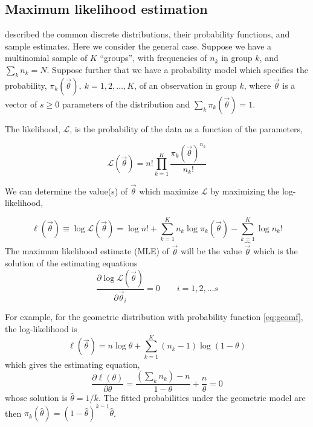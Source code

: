 \subsection{Maximum likelihood estimation}
 described the common discrete distributions,
their probability functions, and sample estimates.
Here we consider the general case.
Suppose we have a multinomial sample of
$K$ ``groups'', with frequencies of $n_k$ in group
$k$, and $\sum_k n_k = N$.
Suppose further that we have a probability model which specifies
the probability, \( \pi_k (\vec{\theta}), \: k = 1, 2, \dots ,  K \),
of an observation in group $k$, where $\vec{\theta}$ is a vector
of $s \geq 0$ parameters of the distribution
and $\sum_k \pi_k (\vec{\theta}) = 1$.

The likelihood, $\mathcal{L}$, is the probability of the data as
a function of the parameters,

\begin{equation*}
  \mathcal{L}(\vec{\theta}) = n ! \prod_{k=1}^K \frac{\pi_k (\vec{\theta})^{n_k}}{n_k !}
\end{equation*}

We can determine the value(s) of $\vec{\theta}$ which maximize $\mathcal{L}$
by maximizing the log-likelihood,

\begin{equation}\label{eq:loglikelihood}
 \ell(\vec{\theta}) \equiv
 \log \mathcal{L}(\vec{\theta}) = \log n ! +
  \sum_{k=1}^K n_k \log \pi_k (\vec{\theta}) - \sum_{k=1}^K \log n_k !
\end{equation}
The maximum likelihood estimate (MLE) of $\vec{\theta}$ will be
the value $\hat{\vec{\theta}}$ which is the solution of the
estimating equations
\begin{equation*}
\frac{\partial \log \mathcal{L}(\vec{\theta})}{\partial \vec{\theta}_i} = 0
\quad\quad i=1, 2, \dots s
\end{equation*}

For example, for the geometric distribution with probability
function \eqref{eq:geomf}, the log-likelihood is
\begin{equation*}
 \ell(\vec{\theta})   = n \log \theta +
  \sum_{k=1}^K (n_k - 1) \log (1-\theta)
\end{equation*}
which gives the estimating equation,
\begin{equation*}
\frac{\partial \ell(\theta)}{\partial \theta} =
\frac{(\sum_k n_k) - n}{1-\theta} + \frac{n}{\theta} = 0
\end{equation*}
whose solution is $\hat{\theta} = 1/\bar{k}$.  The fitted probabilities
under the geometric model
are then $\pi_k (\hat{\theta}) = (1 - \hat{\theta})^{k-1} \hat{\theta}$.

